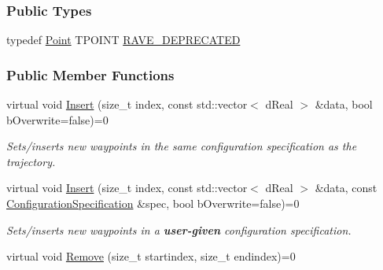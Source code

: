\subsubsection*{Public Types}
\begin{DoxyCompactItemize}
\item 
typedef \hyperlink{classOpenRAVE_1_1TrajectoryBase_1_1Point}{Point} TPOINT \hyperlink{classOpenRAVE_1_1TrajectoryBase_a16220697329e6c8f40dd5e0ec4f4b384}{RAVE\_\-DEPRECATED}
\end{DoxyCompactItemize}
\subsubsection*{Public Member Functions}
\begin{DoxyCompactItemize}
\item 
virtual void \hyperlink{classOpenRAVE_1_1TrajectoryBase_a2d4b62249bd00ee23a28a491fce41dc1}{Insert} (size\_\-t index, const std::vector$<$ dReal $>$ \&data, bool bOverwrite=false)=0
\begin{DoxyCompactList}\small\item\em Sets/inserts new waypoints in the same configuration specification as the trajectory. \item\end{DoxyCompactList}\item 
virtual void \hyperlink{classOpenRAVE_1_1TrajectoryBase_a1adb5dcb120bbec5da9e326a84d61fb9}{Insert} (size\_\-t index, const std::vector$<$ dReal $>$ \&data, const \hyperlink{classOpenRAVE_1_1ConfigurationSpecification}{ConfigurationSpecification} \&spec, bool bOverwrite=false)=0
\begin{DoxyCompactList}\small\item\em Sets/inserts new waypoints in a {\bfseries user-\/given} configuration specification. \item\end{DoxyCompactList}\item 
\hypertarget{classOpenRAVE_1_1TrajectoryBase_aa2b3c4b3091179afbb354f985e15701f}{
virtual void \hyperlink{classOpenRAVE_1_1TrajectoryBase_aa2b3c4b3091179afbb354f985e15701f}{Remove} (size\_\-t startindex, size\_\-t endindex)=0}
\label{classOpenRAVE_1_1TrajectoryBase_aa2b3c4b3091179afbb354f985e15701f}


\end{DoxyCompactItemize}
